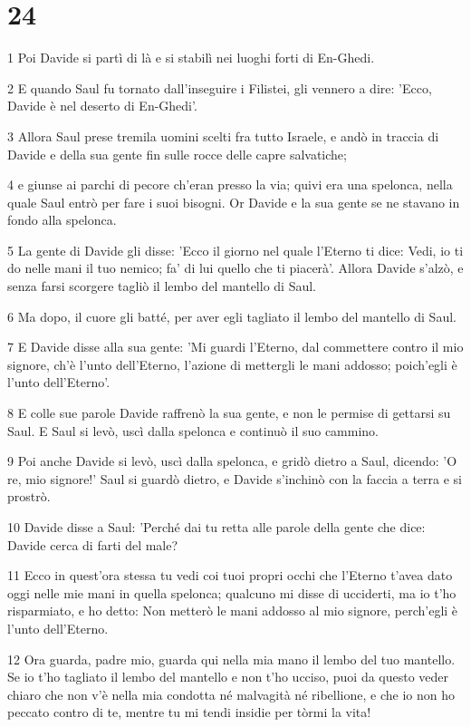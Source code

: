 \chapter{24}

\par 1 Poi Davide si partì di là e si stabilì nei luoghi forti di En-Ghedi.
\par 2 E quando Saul fu tornato dall'inseguire i Filistei, gli vennero a dire: 'Ecco, Davide è nel deserto di En-Ghedi'.
\par 3 Allora Saul prese tremila uomini scelti fra tutto Israele, e andò in traccia di Davide e della sua gente fin sulle rocce delle capre salvatiche;
\par 4 e giunse ai parchi di pecore ch'eran presso la via; quivi era una spelonca, nella quale Saul entrò per fare i suoi bisogni. Or Davide e la sua gente se ne stavano in fondo alla spelonca.
\par 5 La gente di Davide gli disse: 'Ecco il giorno nel quale l'Eterno ti dice: Vedi, io ti do nelle mani il tuo nemico; fa' di lui quello che ti piacerà'. Allora Davide s'alzò, e senza farsi scorgere tagliò il lembo del mantello di Saul.
\par 6 Ma dopo, il cuore gli batté, per aver egli tagliato il lembo del mantello di Saul.
\par 7 E Davide disse alla sua gente: 'Mi guardi l'Eterno, dal commettere contro il mio signore, ch'è l'unto dell'Eterno, l'azione di mettergli le mani addosso; poich'egli è l'unto dell'Eterno'.
\par 8 E colle sue parole Davide raffrenò la sua gente, e non le permise di gettarsi su Saul. E Saul si levò, uscì dalla spelonca e continuò il suo cammino.
\par 9 Poi anche Davide si levò, uscì dalla spelonca, e gridò dietro a Saul, dicendo: 'O re, mio signore!' Saul si guardò dietro, e Davide s'inchinò con la faccia a terra e si prostrò.
\par 10 Davide disse a Saul: 'Perché dai tu retta alle parole della gente che dice: Davide cerca di farti del male?
\par 11 Ecco in quest'ora stessa tu vedi coi tuoi propri occhi che l'Eterno t'avea dato oggi nelle mie mani in quella spelonca; qualcuno mi disse di ucciderti, ma io t'ho risparmiato, e ho detto: Non metterò le mani addosso al mio signore, perch'egli è l'unto dell'Eterno.
\par 12 Ora guarda, padre mio, guarda qui nella mia mano il lembo del tuo mantello. Se io t'ho tagliato il lembo del mantello e non t'ho ucciso, puoi da questo veder chiaro che non v'è nella mia condotta né malvagità né ribellione, e che io non ho peccato contro di te, mentre tu mi tendi insidie per tòrmi la vita!
